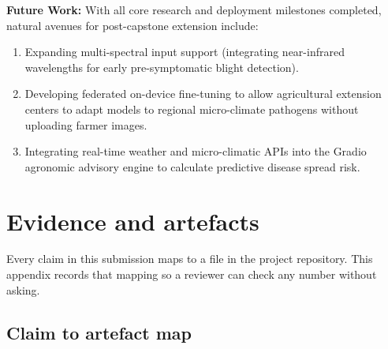 \documentclass[12pt,a4paper]{report}
\begin{document}
\textbf{Future Work:}
With all core research and deployment milestones completed, natural avenues for post-capstone
extension include:
\begin{enumerate}[leftmargin=1.4em,itemsep=2pt]
\item Expanding multi-spectral input support (integrating near-infrared wavelengths for early pre-symptomatic blight detection).
\item Developing federated on-device fine-tuning to allow agricultural extension centers to adapt models to regional micro-climate pathogens without uploading farmer images.
\item Integrating real-time weather and micro-climatic APIs into the Gradio agronomic advisory engine to calculate predictive disease spread risk.
\end{enumerate}


\appendix
\chapter{Evidence and artefacts}

Every claim in this submission maps to a file in the project repository. This
appendix records that mapping so a reviewer can check any number without asking.

\section{Claim to artefact map}
\end{document}
